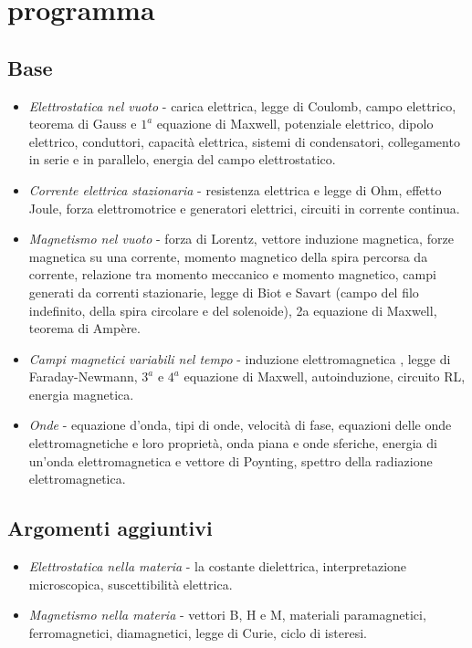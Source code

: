 \chapter{programma}
\section{Base}
\begin{itemize}
	\item \textit{Elettrostatica nel vuoto} - carica elettrica, legge di Coulomb, campo elettrico, teorema di Gauss e $1^a$ equazione di Maxwell, potenziale elettrico, dipolo elettrico, conduttori, capacità elettrica, sistemi di condensatori, collegamento in serie e in parallelo, energia del campo elettrostatico.
	\item \textit{Corrente elettrica stazionaria} - resistenza elettrica e legge di Ohm, effetto Joule, forza elettromotrice e generatori elettrici, circuiti in corrente continua.
	\item \textit{Magnetismo nel vuoto} - forza di Lorentz, vettore induzione magnetica, forze magnetica
	 su una corrente, momento magnetico della spira percorsa da corrente, relazione tra momento
	 meccanico e momento magnetico, campi generati da correnti stazionarie, legge di Biot e Savart (campo
	 del filo indefinito, della spira circolare e del solenoide), 2a equazione di Maxwell, teorema di Ampère.
	\item \textit{Campi magnetici variabili nel tempo} - induzione elettromagnetica , legge di 
	Faraday-Newmann, $3^a$ e $4^a$ equazione di Maxwell, autoinduzione, circuito RL, 
	energia magnetica.
	\item \textit{Onde} - equazione d'onda, tipi di onde, velocità di fase, equazioni delle onde
	elettromagnetiche e loro proprietà, onda piana e onde sferiche, energia di un'onda 
	elettromagnetica e vettore di Poynting, spettro della radiazione elettromagnetica. 
\end{itemize}
\section{Argomenti aggiuntivi}
\begin{itemize}
	\item \textit{Elettrostatica nella materia} - la costante dielettrica, interpretazione microscopica, suscettibilità elettrica.
	\item \textit{Magnetismo nella materia} - vettori B, H e M, materiali paramagnetici, ferromagnetici, diamagnetici, legge di Curie, ciclo di isteresi.
\end{itemize}
